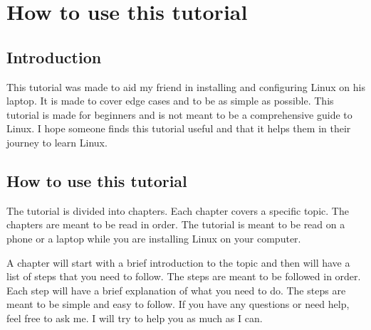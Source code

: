 \documentclass{book}
\begin{document}
\chapter{How to use this tutorial}
\section{Introduction}
This tutorial was made to aid my friend in installing and configuring Linux on his laptop. It is made to cover edge cases and to be as simple as possible. This tutorial is made for beginners and is not meant to be a comprehensive guide to Linux. I hope someone finds this tutorial useful and that it helps them in their journey to learn Linux.

\section{How to use this tutorial}
The tutorial is divided into chapters. Each chapter covers a specific topic. The chapters are meant to be read in order. The tutorial is meant to be read on a phone or a laptop while you are installing Linux on your computer.\par

A chapter will start with a brief introduction to the topic and then will have a list of steps that you need to follow. The steps are meant to be followed in order. Each step will have a brief explanation of what you need to do. The steps are meant to be simple and easy to follow. If you have any questions or need help, feel free to ask me. I will try to help you as much as I can.\par


\end{document}
